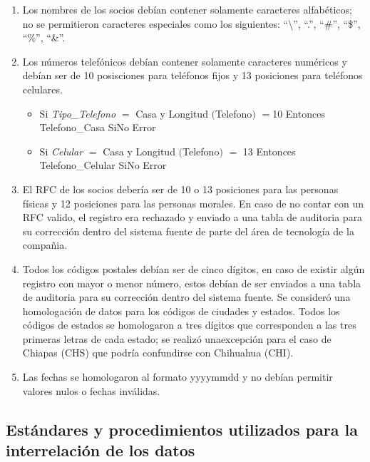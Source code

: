 \documentclass[a4paper,openright,12pt]{book}
\begin{document}
\begin{enumerate}

\item Los nombres de los socios debían contener solamente caracteres
  alfabéticos; no se permitieron caracteres especiales como los siguientes:
  ``\textbackslash'', ``.'', ``\#'', ``\$'', ``\%'', ``\&''.

\item Los números telefónicos debían contener solamente caracteres numéricos y
  debían ser de 10 posisciones para teléfonos fijos y 13 posiciones para
  teléfonos celulares.

  \begin{itemize}
  \item Si \textit{Tipo\_Telefono} $=$ Casa y Longitud $($Telefono$)$ $=$10
    Entonces Telefono\_Casa SiNo Error
  \item Si \textit{Celular} $=$ Casa y Longitud $($Telefono$)$ $=$ 13 Entonces
    Telefono\_Celular SiNo Error
  \end{itemize}

\item El RFC de los socios debería ser de 10 o 13 posiciones para las personas
  físicas y 12 posiciones para las personas morales. En caso de no contar con un
  RFC valido, el registro era rechazado y enviado a una tabla de auditoria para
  su corrección dentro del sistema fuente de parte del área de tecnología de la
  compañia.

\item Todos los códigos postales debían ser de cinco dígitos, en caso de existir
  algún registro con mayor o menor número, estos debían de ser enviados a una
  tabla de auditoria para su corrección dentro del sistema fuente. Se consideró
  una homologación de datos para los códigos de ciudades y estados. Todos los
  códigos de estados se homologaron a tres dígitos que corresponden a las tres
  primeras letras de cada estado; se realizó unaexcepción para el caso de
  Chiapas (CHS) que podría confundirse con Chihuahua (CHI).

\item Las fechas se homologaron al formato yyyymmdd y no debían permitir valores
  nulos o fechas inválidas.

\end{enumerate}

\subsection{Estándares y procedimientos utilizados para la interrelación de los datos}
\end{document}

